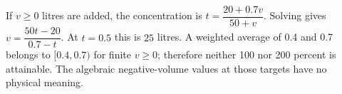 If $v\ge0$ litres are added, the concentration is $t=\dfrac{20+0.7v}{50+v}$. Solving gives $v=\dfrac{50t-20}{0.7-t}$. At $t=0.5$ this is $\boxed{25}$ litres. A weighted average of 0.4 and 0.7 belongs to $[0.4,0.7)$ for finite $v\ge0$; therefore neither 100 nor 200 percent is attainable. The algebraic negative-volume values at those targets have no physical meaning.
